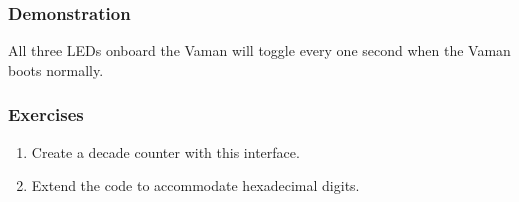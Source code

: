 \subsubsection{Demonstration}
All three LEDs onboard the Vaman will toggle every one second when the Vaman
boots normally.

\subsubsection{Exercises}
\begin{enumerate}[resume]
    \item Create a decade counter with this interface.
    \item Extend the code to accommodate hexadecimal digits.
\end{enumerate}